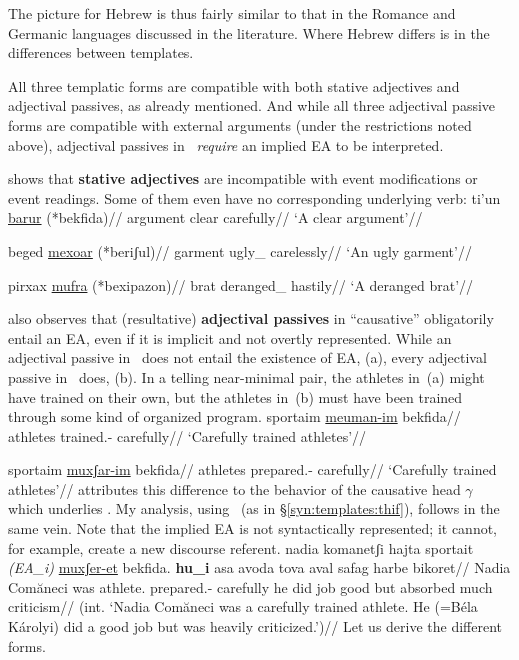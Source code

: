 The picture for Hebrew is thus fairly similar to that in the Romance and Germanic languages discussed in the literature. Where Hebrew differs is in the differences between templates.

All three templatic forms are compatible with both stative adjectives and adjectival passives, as already mentioned. And while all three adjectival passive forms are compatible with external arguments (under the restrictions noted above), adjectival passives in \mhuf~\emph{require} an implied EA to be interpreted.

\citet[170]{doron14adj} shows that \textbf{stative adjectives} are incompatible with event modifications or event readings. Some of them even have no corresponding underlying verb:
\pex
	\a \begingl
		\gla ti'un \underline{barur} (*bekfida)//
		\glb argument clear \phantom{(*}carefully//
		\glft `A clear argument'//
	\endgl

	\a \begingl
		\gla beged \underline{mexoar} (*beriʃul)//
		\glb garment ugly_{} \phantom{(*}carelessly//
		\glft `An ugly garment'//
	\endgl

	\a \begingl
		\gla pirxax \underline{mufra} (*bexipazon)//
		\glb brat deranged_{} \phantom{(*}hastily//
		\glft `A deranged brat'//
	\endgl
\xe

\citet[175]{doron14adj} also observes that (resultative) \textbf{adjectival passives} in ``causative'' {\mhuf} obligatorily entail an EA, even if it is implicit and not overtly represented. While an adjectival passive in \mpua~does not entail the existence of EA, (\nextx a), every adjectival passive in \mhuf~does, (\nextx b). In a telling near-minimal pair, the athletes in~(\nextx a) might have trained on their own, but the athletes in~(\nextx b) must have been trained through some kind of organized program.
\pex\label{ex:sportaim}
	\a \begingl
		\gla\rightcomment{(\mpua)}sportaim \underline{meuman-im} bekfida//
		\glb athletes trained.- carefully//
		\glft `Carefully trained athletes'//
	\endgl
	
	\a \begingl
		\gla\rightcomment{(\mhuf)}sportaim \underline{muxʃar-im} bekfida//
		\glb athletes prepared.- carefully//
		\glft `Carefully trained athletes'//
	\endgl
\xe
\cite{doron14adj} attributes this difference to the behavior of the causative head $\gamma$ which underlies \thif. My analysis, using \vd~(as in \S\ref{syn:templates:thif}), follows in the same vein. Note that the implied EA is not syntactically represented; it cannot, for example, create a new discourse referent.
\ex\label{ex:sportait} \ljudge{*}
	\begingl
		\gla nadia komanetʃi hajta sportait \emph{(EA_i)} \underline{muxʃer-et} bekfida. \textbf{hu_i} asa avoda tova aval safag harbe bikoret//
		\glb Nadia Com\u{a}neci was athlete. {} prepared.- carefully he did job good but absorbed much criticism//
		\glft (int. `Nadia Com\u{a}neci was a carefully trained athlete. He (=B\'ela K\'arolyi) did a good job but was heavily criticized.')//
	\endgl
\xe
Let us derive the different forms.

